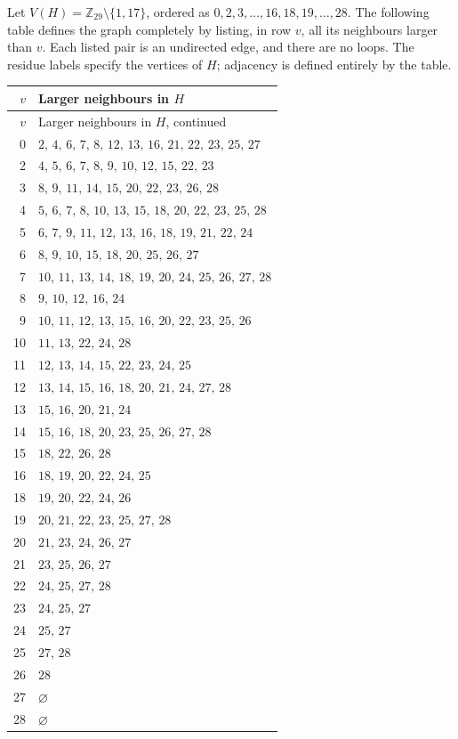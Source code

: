 Let \(V(H)=\mathbb Z_{29}\setminus\{1,17\}\), ordered as
\(0,2,3,\ldots,16,18,19,\ldots,28\). The following table defines the graph completely
by listing, in row \(v\), all its neighbours larger than \(v\).
Each listed pair is an undirected edge, and there are no loops.
The residue labels specify the vertices of \(H\); adjacency is defined
entirely by the table.
\begin{longtable}{r@{\quad}p{}}
\toprule
\(v\)&Larger neighbours in \(H\)\\
\midrule
\endfirsthead
\toprule
\(v\)&Larger neighbours in \(H\), continued\\
\midrule
\endhead
0&\(2,\,4,\,6,\,7,\,8,\,12,\,13,\,16,\,21,\,22,\,23,\,25,\,27\)\\
2&\(4,\,5,\,6,\,7,\,8,\,9,\,10,\,12,\,15,\,22,\,23\)\\
3&\(8,\,9,\,11,\,14,\,15,\,20,\,22,\,23,\,26,\,28\)\\
4&\(5,\,6,\,7,\,8,\,10,\,13,\,15,\,18,\,20,\,22,\,23,\,25,\,28\)\\
5&\(6,\,7,\,9,\,11,\,12,\,13,\,16,\,18,\,19,\,21,\,22,\,24\)\\
6&\(8,\,9,\,10,\,15,\,18,\,20,\,25,\,26,\,27\)\\
7&\(10,\,11,\,13,\,14,\,18,\,19,\,20,\,24,\,25,\,26,\,27,\,28\)\\
8&\(9,\,10,\,12,\,16,\,24\)\\
9&\(10,\,11,\,12,\,13,\,15,\,16,\,20,\,22,\,23,\,25,\,26\)\\
10&\(11,\,13,\,22,\,24,\,28\)\\
11&\(12,\,13,\,14,\,15,\,22,\,23,\,24,\,25\)\\
12&\(13,\,14,\,15,\,16,\,18,\,20,\,21,\,24,\,27,\,28\)\\
13&\(15,\,16,\,20,\,21,\,24\)\\
14&\(15,\,16,\,18,\,20,\,23,\,25,\,26,\,27,\,28\)\\
15&\(18,\,22,\,26,\,28\)\\
16&\(18,\,19,\,20,\,22,\,24,\,25\)\\
18&\(19,\,20,\,22,\,24,\,26\)\\
19&\(20,\,21,\,22,\,23,\,25,\,27,\,28\)\\
20&\(21,\,23,\,24,\,26,\,27\)\\
21&\(23,\,25,\,26,\,27\)\\
22&\(24,\,25,\,27,\,28\)\\
23&\(24,\,25,\,27\)\\
24&\(25,\,27\)\\
25&\(27,\,28\)\\
26&\(28\)\\
27&\(\varnothing\)\\
28&\(\varnothing\)\\
\bottomrule
\end{longtable}
